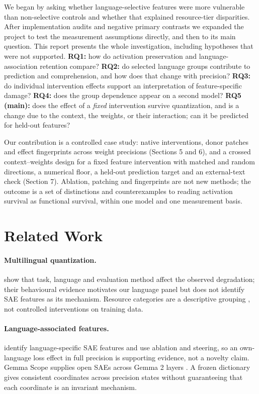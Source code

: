 We began by asking whether language-selective features were more vulnerable than non-selective controls and whether that explained resource-tier disparities. After implementation audits and negative primary contrasts we expanded the project to test the measurement assumptions directly, and then to its main question. This report presents the whole investigation, including hypotheses that were not supported. \textbf{RQ1:} how do activation preservation and language-association retention compare? \textbf{RQ2:} do selected language groups contribute to prediction and comprehension, and how does that change with precision? \textbf{RQ3:} do individual intervention effects support an interpretation of feature-specific damage? \textbf{RQ4:} does the group dependence appear on a second model? \textbf{RQ5 (main):} does the effect of a \emph{fixed} intervention survive quantization, and is a change due to the context, the weights, or their interaction; can it be predicted for held-out features?

Our contribution is a controlled case study: native interventions, donor patches and effect fingerprints across weight precisions (Sections 5 and 6), and a crossed context--weights design for a fixed feature intervention with matched and random directions, a numerical floor, a held-out prediction target and an external-text check (Section 7). Ablation, patching and fingerprints are not new methods; the outcome is a set of distinctions and counterexamples to reading activation survival as functional survival, within one model and one measurement basis.

\section{Related Work}
\paragraph{Multilingual quantization.}
\citet{marchisio-etal-2024-quantization} show that task, language and evaluation method affect the observed degradation; their behavioural evidence motivates our language panel but does not identify SAE features as its mechanism. Resource categories are a descriptive grouping \citep{joshi-etal-2020-state}, not controlled interventions on training data.

\paragraph{Language-associated features.}
\citet{deng-etal-2025-unveiling} identify language-specific SAE features and use ablation and steering, so an own-language loss effect in full precision is supporting evidence, not a novelty claim. Gemma Scope supplies open SAEs across Gemma 2 layers \citep{lieberum-etal-2024-gemma}. A frozen dictionary gives consistent coordinates across precision states without guaranteeing that each coordinate is an invariant mechanism.

